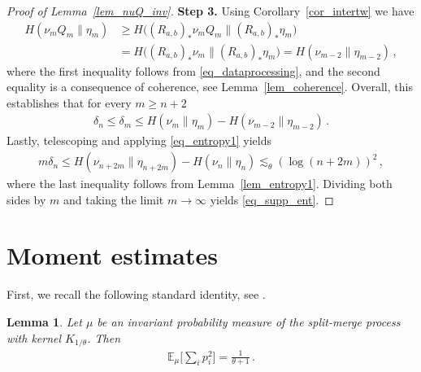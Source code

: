\documentclass[a4paper,11pt]{article}
\newcommand{\EE}{\mathbb{E}}
\numberwithin{equation}{section}
\newtheorem{lemma}[theorem]{Lemma}
\begin{document}
\begin{proof}[Proof of Lemma~\ref{lem_nuQ_inv}]
\textbf{Step 3.} 
Using Corollary~\ref{cor_intertw} we have
\begin{equation*}
\begin{aligned}
 H ( \nu_{m}Q_{m}\| \eta_{m}) &\geqslant  H \big( (R_{a,b} )_{\ast}\nu_{m}Q_{m}\| (R_{a,b} )_{\ast}\eta_{m}\big) \\
 &=  H \big( (R_{a,b} )_{\ast}\nu_{m}\| (R_{a,b} )_{\ast}\eta_{m}\big)
 =
 H ( \nu_{m-2}\| \eta_{m-2})\,,
\end{aligned}
\end{equation*}
where the first inequality follows from \eqref{eq_dataprocessing}, and the second equality is a consequence of coherence, see Lemma~\ref{lem_coherence}.
Overall, this establishes that for every $ m \geq n +2$ 
\begin{equation}\label{eq_entropy1}
\begin{aligned}
\delta_{n} \leqslant \delta_{m}
	\leqslant 
H ( \nu_{m}\| \eta_{m}) -
H ( \nu_{m-2}\| \eta_{m-2})\,.
\end{aligned}
\end{equation}
Lastly, telescoping and applying \eqref{eq_entropy1} yields
\begin{equation*}
\begin{aligned}
	 m \delta_{n}
\leqslant H ( \nu_{n+2m}\| \eta_{n+2m}) -
H ( \nu_{n}\| \eta_{n})
\lesssim_{\theta} (\log{(n+2m)} )^{2}\,,
\end{aligned}
\end{equation*}
where the last inequality follows from Lemma~\ref{lem_entropy1}.
Dividing both sides by $m$ and taking the limit $m \to \infty$ yields \eqref{eq_supp_ent}.
\end{proof}





\appendix 


\section{Moment estimates}

First, we recall the following standard identity, see \cite[Lemma~5]{MWZZ2002}.
\begin{lemma}\label{lem_q}
Let $ \mu$ be an invariant probability measure of the split-merge process with kernel $ K_{1/ \theta} $. Then
\begin{equation*}
\begin{aligned}
\EE_{\mu}\bigg[ \sum_{i} p_{i}^{2} \bigg] = \frac{1}{\theta + 1} \,.
\end{aligned}
\end{equation*}
\end{lemma}
\end{document}
